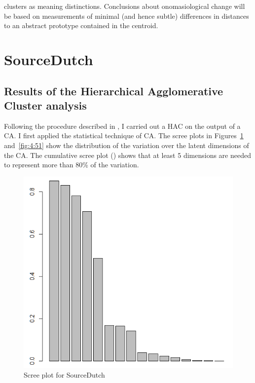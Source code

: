 clusters as meaning distinctions. Conclusions about onomasiological change will be based on measurements of minimal (and hence subtle) differences in distances to an abstract prototype contained in the centroid. 

\section{SourceDutch}
\label{sec:4.2}  
\subsection{Results of the Hierarchical Agglomerative Cluster analysis}
\label{sec:4.2.1}  
Following the procedure described in , I carried out a HAC on the output of a CA. I first applied the statistical technique of CA. The scree plots in Figures~\ref{fig:4:50} and~\ref{fig:4:51} show the distribution of the variation over the latent dimensions of the CA. The cumulative scree plot () shows that at least 5 dimensions are needed to represent more than 80\% of the variation.

\begin{figure}
\includegraphics[height=.4\textheight]{figures/Vandevoorde2-img50.png}
\caption{\label{fig:4:50}Scree plot for SourceDutch}
\end{figure}


